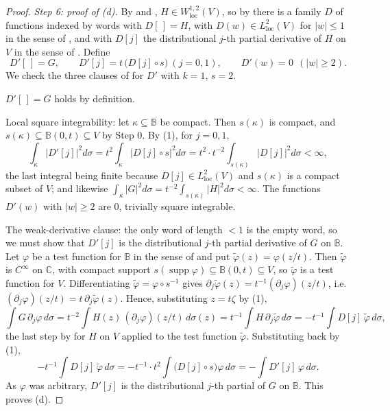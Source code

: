 \begin{proof}
\emph{Step 6: proof of (d).}  By  and
, $H\in W^{1,2}_{\mathrm{loc}}(V)$, so by
 there is a family $D$ of functions indexed by words with
$D[\,]=H$, with $D(w)\in L^2_{\mathrm{loc}}(V)$ for $|w|\le1$ in the sense of
, and with $D[j]$ the distributional $j$-th partial
derivative of $H$ on $V$ in the sense of .  Define
\[
  D'[\,]=G,\qquad D'[j]=t\,\bigl(D[j]\circ s\bigr)\ (j=0,1),\qquad
  D'(w)=0\ \ (|w|\ge2).
\]
We check the three clauses of  for $D'$ with $k=1$, $s=2$.

$D'[\,]=G$ holds by definition.

Local square integrability: let $\kappa\subseteq\mathbb{B}$ be compact.  Then
$s(\kappa)$ is compact, and $s(\kappa)\subseteq\mathbb{B}(0,t)\subseteq V$ by
Step 0.  By (1), for $j=0,1$,
\[
  \int_{\kappa}\bigl|D'[j]\bigr|^2d\sigma
  =t^2\int_\kappa\bigl|D[j]\circ s\bigr|^2d\sigma
  =t^2\cdot t^{-2}\int_{s(\kappa)}\bigl|D[j]\bigr|^2d\sigma<\infty,
\]
the last integral being finite because $D[j]\in L^2_{\mathrm{loc}}(V)$ and
$s(\kappa)$ is a compact subset of $V$; and likewise
$\int_\kappa|G|^2d\sigma=t^{-2}\int_{s(\kappa)}|H|^2d\sigma<\infty$.  The
functions $D'(w)$ with $|w|\ge2$ are $0$, trivially square integrable.

The weak-derivative clause: the only word of length $<1$ is the empty word, so
we must show that $D'[j]$ is the distributional $j$-th partial derivative of
$G$ on $\mathbb{B}$.  Let $\varphi$ be a test function for $\mathbb{B}$ in the
sense of  and put $\tilde\varphi(z)=\varphi(z/t)$.  Then
$\tilde\varphi$ is $C^\infty$ on $\mathbb{C}$, with compact support
$s(\operatorname{supp}\varphi)\subseteq\mathbb{B}(0,t)\subseteq V$, so
$\tilde\varphi$ is a test function for $V$.  Differentiating
$\tilde\varphi=\varphi\circ s^{-1}$ gives
$\partial_j\tilde\varphi(z)=t^{-1}(\partial_j\varphi)(z/t)$, i.e.
$(\partial_j\varphi)(z/t)=t\,\partial_j\tilde\varphi(z)$.  Hence, substituting
$z=t\zeta$ by (1),
\[
  \int G\,\partial_j\varphi\,d\sigma
  =t^{-2}\int H(z)\,(\partial_j\varphi)(z/t)\,d\sigma(z)
  =t^{-1}\int H\,\partial_j\tilde\varphi\,d\sigma
  =-t^{-1}\int D[j]\,\tilde\varphi\,d\sigma,
\]
the last step by  for $H$ on $V$ applied to the test
function $\tilde\varphi$.  Substituting back by (1),
\[
  -t^{-1}\int D[j]\,\tilde\varphi\,d\sigma
  =-t^{-1}\cdot t^{2}\int \bigl(D[j]\circ s\bigr)\varphi\,d\sigma
  =-\int D'[j]\,\varphi\,d\sigma .
\]
As $\varphi$ was arbitrary, $D'[j]$ is the distributional $j$-th partial of $G$
on $\mathbb{B}$.  This proves (d).


\end{proof}
